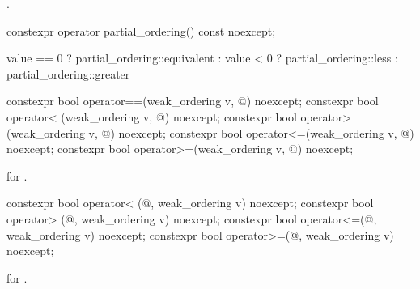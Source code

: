 \begin{itemdescr}
\pnum
\returns
{}.
\end{itemdescr}

%
\begin{itemdecl}
constexpr operator partial_ordering() const noexcept;
\end{itemdecl}

\begin{itemdescr}
\pnum
\returns
\begin{codeblock}
value == 0 ? partial_ordering::equivalent :
value < 0  ? partial_ordering::less :
             partial_ordering::greater
\end{codeblock}
\end{itemdescr}

%
%
%
%
%
\begin{itemdecl}
constexpr bool operator==(weak_ordering v, @\unspec@) noexcept;
constexpr bool operator< (weak_ordering v, @\unspec@) noexcept;
constexpr bool operator> (weak_ordering v, @\unspec@) noexcept;
constexpr bool operator<=(weak_ordering v, @\unspec@) noexcept;
constexpr bool operator>=(weak_ordering v, @\unspec@) noexcept;
\end{itemdecl}

\begin{itemdescr}
\pnum
\returns
{} for .
\end{itemdescr}

%
%
%
%
\begin{itemdecl}
constexpr bool operator< (@\unspec@, weak_ordering v) noexcept;
constexpr bool operator> (@\unspec@, weak_ordering v) noexcept;
constexpr bool operator<=(@\unspec@, weak_ordering v) noexcept;
constexpr bool operator>=(@\unspec@, weak_ordering v) noexcept;
\end{itemdecl}

\begin{itemdescr}
\pnum
\returns
{} for .
\end{itemdescr}

